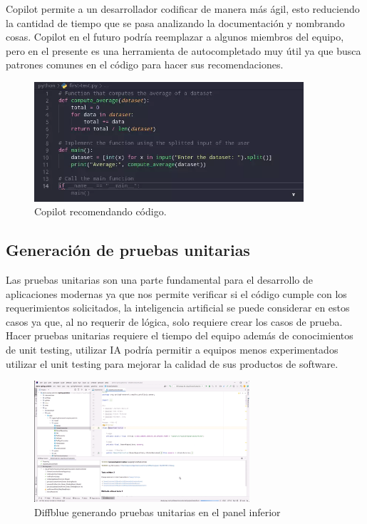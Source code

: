 \documentclass[11pt]{article}
\begin{document}
Copilot permite a un desarrollador codificar de manera más ágil, esto
reduciendo la cantidad de tiempo que se pasa analizando la
documentación y nombrando cosas. Copilot en el futuro podría
reemplazar a algunos miembros del equipo, pero en el presente es una
herramienta de autocompletado muy útil ya que busca patrones comunes
en el código para hacer sus recomendaciones.  

\begin{figure}[htbp]
\centering
\includegraphics[width=10cm]{img/copilot.png}
\caption{Copilot recomendando código.}
\end{figure}

\subsection{Generación de pruebas unitarias}
\label{sec:orgf540ca0}
Las pruebas unitarias son una parte fundamental para el desarrollo de
aplicaciones modernas ya que nos permite verificar si el código cumple
con los requerimientos solicitados, la inteligencia artificial se
puede considerar en estos casos ya que, al no requerir de lógica,
solo requiere crear los casos de prueba. \\

Hacer pruebas unitarias requiere el tiempo del equipo además de
conocimientos de unit testing, utilizar IA podría permitir a equipos
menos experimentados utilizar el unit testing para mejorar la calidad
de sus productos de software.

\begin{figure}[htbp]
\centering
\includegraphics[width=8cm]{img/diffblue.png}
\caption{Diffblue generando pruebas unitarias en el panel inferior}
\end{figure}
\end{document}
